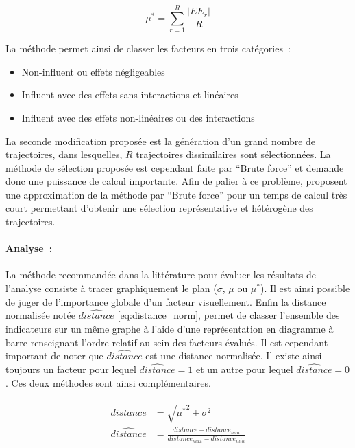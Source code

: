 \begin{equation}\label{eq:moyenne_absolue}
    \mu^{*} = \sum_{r = 1}^{R} \frac{\lvert EE_{r} \rvert}{R}
\end{equation}

\noindent La méthode permet ainsi de classer les facteurs en trois catégories~:
\begin{itemize}
  \item Non-influent ou effets négligeables
  \item Influent avec des effets sans interactions et linéaires
  \item Influent avec des effets non-linéaires ou des interactions
\end{itemize}

La seconde modification proposée est la génération d’un grand nombre de trajectoires,
dans lesquelles, $R$ trajectoires dissimilaires sont sélectionnées. La méthode de sélection
proposée est cependant faite par \enquote{Brute force} et demande donc une puissance de
calcul importante.
Afin de palier à ce problème, \textcite{Ruano2012103} proposent une approximation de
la méthode par \enquote{Brute force} pour un temps de calcul très court permettant d’obtenir
une sélection représentative et hétérogène des trajectoires.

\paragraph{Analyse~:} %
\label{par:analyse}
La méthode recommandée dans la littérature pour évaluer les résultats de l’analyse
consiste à tracer graphiquement le plan ($\sigma$, $\mu$ ou $\mu^{*}$). Il est
ainsi possible de juger de l’importance globale d’un facteur visuellement.
Enfin la distance normalisée notée $\hat{distance}$ \eqref{eq:distance_norm}, permet
de classer l’ensemble des indicateurs sur un même graphe à l’aide d’une représentation
en diagramme à barre renseignant l’ordre relatif au sein des facteurs évalués.
Il est cependant important de noter que $\hat{distance}$ est une distance
normalisée. Il existe ainsi toujours un facteur pour lequel $\hat{distance} = 1$ et un autre
pour lequel $\hat{distance} = 0$. Ces deux méthodes sont ainsi complémentaires.

\begin{align}\label{eq:distance_norm}
    \begin{split}
        distance        &= \sqrt{{\mu^{*}}^2 + \sigma^{2}} \\
        \hat{distance}  &=  \frac{distance - distance_{min}}{distance_{max} - distance_{min}}
    \end{split}
\end{align}


